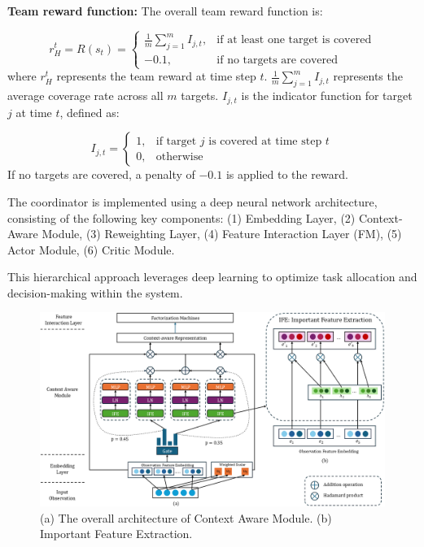 \documentclass[preprint,12pt]{elsarticle}
\begin{document}

\noindent\textbf{Team reward function:} The overall team reward function is:

\begin{equation}
r_H^t = R(s_t) =
\begin{cases}
\frac{1}{m} \sum_{j=1}^{m} I_{j,t}, & \text{if at least one target is covered} \\
-0.1, & \text{if no targets are covered}
\end{cases}  
\end{equation}
where \( r_H^t \) represents the team reward at time step \( t \). \( \frac{1}{m} \sum_{j=1}^{m} I_{j,t} \) represents the average coverage rate across all \( m \) targets. \( I_{j,t} \) is the indicator function for target \( j \) at time \( t \), defined as:

\[
I_{j,t} =
\begin{cases}
1, & \text{if target } j \text{ is covered at time step } t \\
0, & \text{otherwise}
\end{cases}
\]
If no targets are covered, a penalty of \(-0.1\) is applied to the reward.


The coordinator is implemented using a deep neural network architecture, consisting of the following key components:
(1) Embedding Layer, (2) Context-Aware Module, (3) Reweighting Layer, (4) Feature Interaction Layer (FM), (5) Actor Module, (6) Critic Module.

This hierarchical approach leverages deep learning to optimize task allocation and decision-making within the system.
\begin{figure}[h]
    \centering
    \includegraphics[width=\linewidth]{graphics/Overview Embedding.png}
    \caption{(a) The overall architecture of Context Aware Module. (b) Important Feature Extraction.}
    \label{fig:context_aware_module}
\end{figure}
\end{document}

